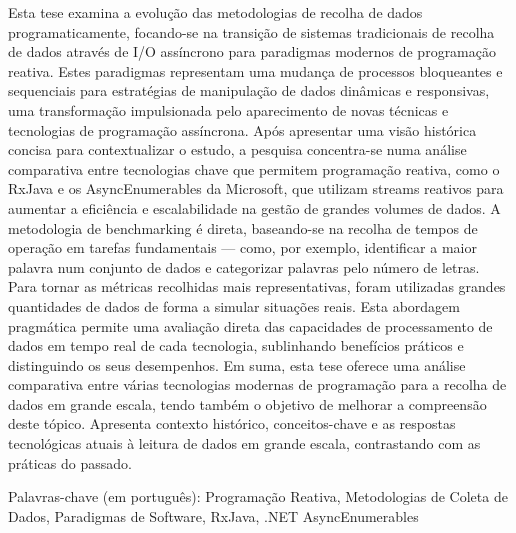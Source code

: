 \abstractPT  %
Esta tese examina a evolução das metodologias de recolha de dados programaticamente, focando-se na transição de sistemas tradicionais de recolha de dados através de I/O assíncrono para paradigmas modernos de programação reativa. Estes paradigmas representam uma mudança de processos bloqueantes e sequenciais para estratégias de manipulação de dados dinâmicas e responsivas, uma transformação impulsionada pelo aparecimento de novas técnicas e tecnologias de programação assíncrona.
Após apresentar uma visão histórica concisa para contextualizar o estudo, a pesquisa concentra-se numa análise comparativa entre tecnologias chave que permitem programação reativa, como o RxJava e os AsyncEnumerables da Microsoft, que utilizam streams reativos para aumentar a eficiência e escalabilidade na gestão de grandes volumes de dados. A metodologia de benchmarking é direta, baseando-se na recolha de tempos de operação em tarefas fundamentais — como, por exemplo, identificar a maior palavra num conjunto de dados e categorizar palavras pelo número de letras. Para tornar as métricas recolhidas mais representativas, foram utilizadas grandes quantidades de dados de forma a simular situações reais.
Esta abordagem pragmática permite uma avaliação direta das capacidades de processamento de dados em tempo real de cada tecnologia, sublinhando benefícios práticos e distinguindo os seus desempenhos.
Em suma, esta tese oferece uma análise comparativa entre várias tecnologias modernas de programação para a recolha de dados em grande escala, tendo também o objetivo de melhorar a compreensão deste tópico. Apresenta contexto histórico, conceitos-chave e as respostas tecnológicas atuais à leitura de dados em grande escala, contrastando com as práticas do passado.
\begin{keywords}
Palavras-chave (em português): Programação Reativa, Metodologias de Coleta de Dados, Paradigmas de Software, RxJava, .NET AsyncEnumerables
\end{keywords}

\vspace{1em} %
